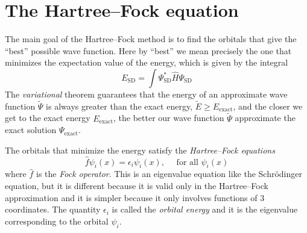\documentclass[../Main/chem371-notes.tex]{subfiles}
\begin{document}
\section{The Hartree--Fock equation}
The main goal of the Hartree--Fock method is to find the orbitals that give the ``best'' possible wave function.
Here by ``best'' we mean precisely the one that minimizes the expectation value of the energy, which is given by the integral
\begin{equation}
E_\mathrm{SD} = \int \Psi_{\mathrm{SD}}^* \hat{H}\Psi_{\mathrm{SD}}
\end{equation}
The \emph{variational} theorem guarantees that the energy of an approximate wave function $\tilde{\Psi}$ is always greater than the exact energy, $\tilde{E} \geq E_\mathrm{exact}$, and the closer we get to the exact energy $E_\mathrm{exact}$, the better our wave function $\tilde{\Psi}$ approximate the exact solution $\Psi_\mathrm{exact}$.

The orbitals that minimize the energy satisfy the \emph{Hartree--Fock equations}
\begin{equation}
\hat{f} \psi_i(x) = \epsilon_i  \psi_i(x), \quad \text{ for all } \psi_i(x)
\end{equation}
where $\hat{f}$ is the \emph{Fock operator}.
This is an eigenvalue equation like the Schr\"{o}dinger equation, but it is different because it is valid only in the Hartree--Fock approximation and it is simpler because it only involves functions of 3 coordinates.
The quantity $\epsilon_i$ is called the \emph{orbital energy} and it is the eigenvalue corresponding to the orbital $\psi_i$.
\end{document}
